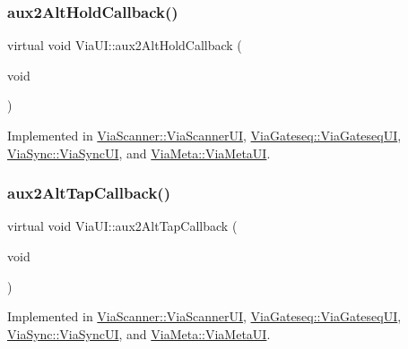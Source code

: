 \mbox{\label{class_via_u_i_ab93989ef608d1b63b854b54278006f49}} 
\subsubsection{\texorpdfstring{aux2\+Alt\+Hold\+Callback()}{aux2AltHoldCallback()}}
{\footnotesize\ttfamily virtual void Via\+U\+I\+::aux2\+Alt\+Hold\+Callback (\begin{DoxyParamCaption}\item[{void}]{ }\end{DoxyParamCaption})\hspace{0.3cm}{\ttfamily [pure virtual]}}



Implemented in \mbox{\hyperlink{class_via_scanner_1_1_via_scanner_u_i_ae1947196ca5cb248c4bc177f02cb20f5}{Via\+Scanner\+::\+Via\+Scanner\+UI}}, \mbox{\hyperlink{class_via_gateseq_1_1_via_gateseq_u_i_ada61d29fe8fd743edbb49500ee6e3d27}{Via\+Gateseq\+::\+Via\+Gateseq\+UI}}, \mbox{\hyperlink{class_via_sync_1_1_via_sync_u_i_af6b69d61a650e68e37286490191634ed}{Via\+Sync\+::\+Via\+Sync\+UI}}, and \mbox{\hyperlink{class_via_meta_1_1_via_meta_u_i_a372fe7280f3107f81e7283ba7451efd6}{Via\+Meta\+::\+Via\+Meta\+UI}}.

\mbox{\label{class_via_u_i_ad13d74c0bd271b83b8da662b22713ddb}} 
\subsubsection{\texorpdfstring{aux2\+Alt\+Tap\+Callback()}{aux2AltTapCallback()}}
{\footnotesize\ttfamily virtual void Via\+U\+I\+::aux2\+Alt\+Tap\+Callback (\begin{DoxyParamCaption}\item[{void}]{ }\end{DoxyParamCaption})\hspace{0.3cm}{\ttfamily [pure virtual]}}



Implemented in \mbox{\hyperlink{class_via_scanner_1_1_via_scanner_u_i_aa862c7243959f99bfd42995102ffcdf5}{Via\+Scanner\+::\+Via\+Scanner\+UI}}, \mbox{\hyperlink{class_via_gateseq_1_1_via_gateseq_u_i_a84c1f0f19956b81f81a7fba2b6581f99}{Via\+Gateseq\+::\+Via\+Gateseq\+UI}}, \mbox{\hyperlink{class_via_sync_1_1_via_sync_u_i_ad837068e55fb66fe3fe2aa15ff90ec21}{Via\+Sync\+::\+Via\+Sync\+UI}}, and \mbox{\hyperlink{class_via_meta_1_1_via_meta_u_i_a5982022f5c08ce9aaa75173209d30e6c}{Via\+Meta\+::\+Via\+Meta\+UI}}.

